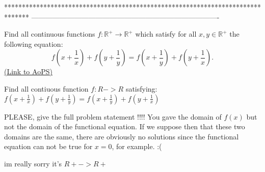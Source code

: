 *******************************************************************************
-------------------------------------------------------------------------------

\begin{problem}
	Find all continuous functions $f: \mathbb R^+ \to \mathbb R^+$ which satisfy for all $x, y \in \mathbb R^+$ the following equation:
\[f\left(x+\frac{1}{x}\right)+f\left(y+\frac{1}{y}\right)=f\left(x+\frac{1}{y}\right)+f\left(y+\frac{1}{x}\right).\]
	\flushright \href{https://artofproblemsolving.com/community/c6h400169}{(Link to AoPS)}
\end{problem}



\begin{solution}
	\begin{tcolorbox}Find all contiuous function $f:R->R$ satisfying:
$f(x+\frac{1}{x})+f(y+\frac{1}{y})=f(x+\frac{1}{y})+f(y+\frac{1}{x})$\end{tcolorbox}
PLEASE, give the full problem statement !!!!
You gave the domain of $f(x)$ but not the domain of the functional equation.
If we suppose then that these two domains are the same, there are obviously no solutions since the functional equation can not be true for $x=0$, for example.
:(
\end{solution}



\begin{solution}
	im really sorry it's $R+->R+$
\end{solution}



